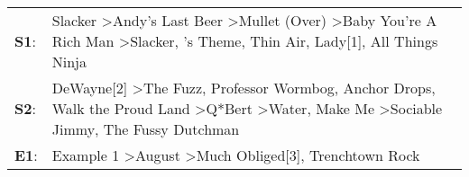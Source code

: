 \begin{supertabular}{p{0.03\textwidth}p{0.92\textwidth}}
 \textbf{S1}:  &                                         Slacker\textsuperscript{} \textgreater \enspace Andy's Last Beer\textsuperscript{} \textgreater \enspace Mullet (Over)\textsuperscript{} \textgreater \enspace Baby You're A Rich Man\textsuperscript{} \textgreater \enspace Slacker\textsuperscript{}, 's Theme\textsuperscript{}, \enspace Thin Air\textsuperscript{}, \enspace Lady[1]\textsuperscript{}, \enspace All Things Ninja\textsuperscript{}  \enspace  \\
 \textbf{S2}:  &  DeWayne[2]\textsuperscript{} \textgreater \enspace The Fuzz\textsuperscript{}, \enspace Professor Wormbog\textsuperscript{}, \enspace Anchor Drops\textsuperscript{}, \enspace Walk the Proud Land\textsuperscript{} \textgreater \enspace Q*Bert\textsuperscript{} \textgreater \enspace Water\textsuperscript{}, \enspace Make Me\textsuperscript{} \textgreater \enspace Sociable Jimmy\textsuperscript{}, \enspace The Fussy Dutchman\textsuperscript{}  \enspace  \\
 \textbf{E1}:  &                                                                                                                                                                                                                                                                               Example 1\textsuperscript{} \textgreater \enspace August\textsuperscript{} \textgreater \enspace Much Obliged[3]\textsuperscript{}, \enspace Trenchtown Rock\textsuperscript{}  \enspace  \\
\end{supertabular}
